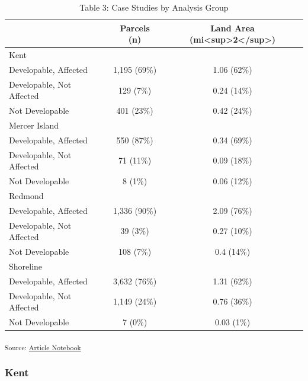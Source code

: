 \documentclass[
]{agujournal2019}
\begin{document}
\begin{longtable}{l|cc}
\caption{Table 3: Case Studies by Analysis Group}\tabularnewline

\toprule
\multicolumn{1}{l}{} & Parcels (n) & Land Area (mi<sup>2</sup>) \\ 
\midrule
\multicolumn{3}{l}{Kent} \\ 
\midrule
Developable, Affected & 1,195 (69\%) & 1.06 (62\%) \\ 
Developable, Not Affected & 129 (7\%) & 0.24 (14\%) \\ 
Not Developable & 401 (23\%) & 0.42 (24\%) \\ 
\midrule
\multicolumn{3}{l}{Mercer Island} \\ 
\midrule
Developable, Affected & 550 (87\%) & 0.34 (69\%) \\ 
Developable, Not Affected & 71 (11\%) & 0.09 (18\%) \\ 
Not Developable & 8 (1\%) & 0.06 (12\%) \\ 
\midrule
\multicolumn{3}{l}{Redmond} \\ 
\midrule
Developable, Affected & 1,336 (90\%) & 2.09 (76\%) \\ 
Developable, Not Affected & 39 (3\%) & 0.27 (10\%) \\ 
Not Developable & 108 (7\%) & 0.4 (14\%) \\ 
\midrule
\multicolumn{3}{l}{Shoreline} \\ 
\midrule
Developable, Affected & 3,632 (76\%) & 1.31 (62\%) \\ 
Developable, Not Affected & 1,149 (24\%) & 0.76 (36\%) \\ 
Not Developable & 7 (0\%) & 0.03 (1\%) \\ 
\bottomrule
\end{longtable}

\textsubscript{Source:
\href{https://tiernanmartin.github.io/2024-transit-oriented-development-bill/index.qmd.html}{Article
Notebook}}

\subsubsection{Kent}\label{kent}
\end{document}
